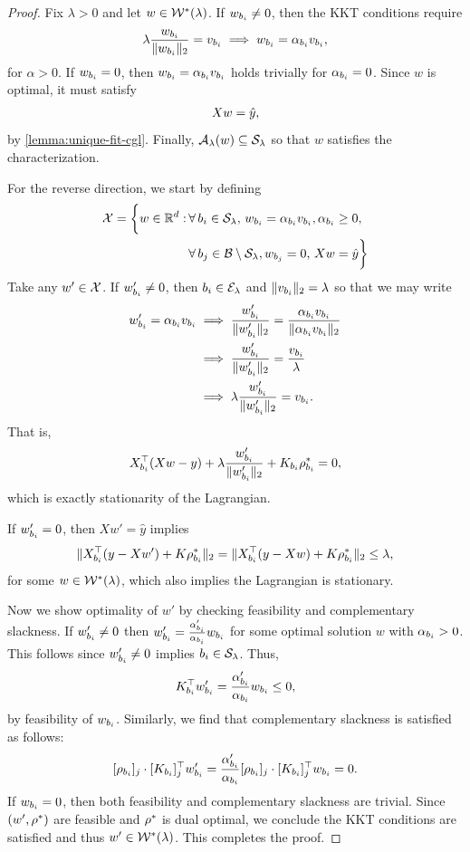\solFnCGL*
\begin{proof}
	Fix \( \lambda > 0 \) and let
	\( w \in \mathcal{W}^*(\lambda) \).
	If \( w_{b_i} \neq 0 \), then the KKT conditions require
	\[
		\lambda \frac{w_{b_i}}{\|w_{b_i}\|_2} = v_{b_i} \implies w_{b_i} = \alpha_{b_i} v_{b_i},
	\]
	for \( \alpha > 0 \).
	If \( w_{b_i} = 0 \), then \( w_{b_i} = \alpha_{b_i} v_{b_i} \) holds trivially for
	\( \alpha_{b_i} = 0 \).
	Since \( w \) is optimal, it must satisfy
	\[
		X w = \hat y,
	\]
	by \cref{lemma:unique-fit-cgl}.
	Finally, \( {\mathcal{A}_{\lambda}}(w) \subseteq \mathcal{S}_\lambda \) so that
	\( w \) satisfies the characterization.

	For the reverse direction, we start by defining
	\[
		\begin{aligned}
			\mathcal{X} =
			\bigg\{ w \in \mathbb{R}^d : \,
			 & \forall \, {b_i} \in \mathcal{S}_\lambda, \,
			w_{b_i} = \alpha_{b_i} v_{b_i}, \alpha_{b_i} \geq 0, \,          \\
			 & \forall \, b_j \in \mathcal{B} \setminus \mathcal{S}_\lambda,
			w_{b_j} = 0, \, X w = \hat y
			\bigg\}
		\end{aligned}
	\]
	Take any \( w' \in \mathcal{X} \).
	If \( w_{b_i}' \neq 0 \), then \( {b_i} \in {\mathcal{E}_{\lambda}} \) and \( \|v_{b_i}\|_2 = \lambda \)
	so that we may write
	\begin{align*}
		w_{b_i}' = \alpha_{b_i} v_{b_i}
		 & \implies \frac{w_{b_i}'}{\|w_{b_i}'\|_2} = \frac{\alpha_{b_i} v_{b_i}}{\|\alpha_{b_i} v_{b_i}\|_2} \\
		 & \implies \frac{w_{b_i}'}{\|w_{b_i}'\|_2} = \frac{v_{b_i}}{\lambda}                            \\
		 & \implies \lambda \frac{w_{b_i}'}{\|w_{b_i}'\|_2} = v_{b_i}.
	\end{align*}
	That is,
	\[
		X_{b_i}^\top (Xw - y) + \lambda \frac{w_{b_i}'}{\|w_{b_i}'\|_2} + K_{{b_i}} \rho^*_{b_i} = 0,
	\]
	which is exactly stationarity of the Lagrangian.

	If \( w_{b_i}' = 0 \), then \( X w' = \hat y \) implies
	\[
		\|X_{b_i}^\top (y - Xw') + K \rho^*_{b_i}\|_2
		= \|X_{b_i}^\top (y - Xw) + K \rho^*_{b_i}\|_2
		\leq \lambda,
	\]
	for some \( w \in \mathcal{W}^*(\lambda) \),
	which also implies the Lagrangian is stationary.

	Now we show optimality of
	\( w' \) by checking feasibility and complementary slackness.
	If \( w_{b_i}' \neq 0  \)
	then \( w_{b_i}' = \frac{\alpha_{b_i}'}{\alpha_{b_i}} w_{b_i} \)
	for some optimal solution \( w \) with \( \alpha_{b_i} > 0 \).
	This follows since \( w_{b_i}' \neq 0 \) implies \( {b_i} \in \mathcal{S}_\lambda \).
	Thus,
	\[
		K_{{b_i}}^\top w_{b_i}' = \frac{\alpha_{b_i}'}{\alpha_{b_i}} w_{b_i} \leq 0,
	\]
	by feasibility of \( w_{b_i} \).
	Similarly, we find that complementary slackness is satisfied as follows:
	\[
		[\rho_{{b_i}}]_j \cdot [K_{{b_i}}]_j^\top w_{b_i}'
		= \frac{\alpha_{b_i}'}{\alpha_{b_i}} [\rho_{{b_i}}]_j \cdot [K_{{b_i}}]_j^\top w_{b_i}
		= 0.
	\]
	If \( w_{b_i} = 0 \), then both feasibility and complementary slackness
	are trivial.
	Since \( (w', \rho^*) \) are feasible and \( \rho^* \) is dual optimal,
	we conclude the KKT conditions are satisfied and thus
	\( w' \in \mathcal{W}^*(\lambda) \).
	This completes the proof.
\end{proof}

